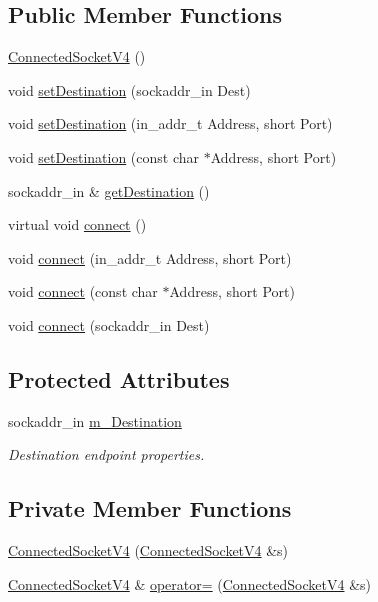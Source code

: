 \subsection*{Public Member Functions}
\begin{DoxyCompactItemize}
\item 
\hyperlink{classConnectedSocketV4_ab6fd7088764d07f276a6be26e2dd8334}{Connected\+Socket\+V4} ()
\item 
void \hyperlink{classConnectedSocketV4_a550cc6530361565ea80e0b2ce892402e}{set\+Destination} (sockaddr\+\_\+in Dest)
\item 
void \hyperlink{classConnectedSocketV4_a8f069939a6796530ba9f2a781e787db7}{set\+Destination} (in\+\_\+addr\+\_\+t Address, short Port)
\item 
void \hyperlink{classConnectedSocketV4_a9ba0783ad8bdeabd25a1ba5a2a1178fc}{set\+Destination} (const char $\ast$Address, short Port)
\item 
sockaddr\+\_\+in \& \hyperlink{classConnectedSocketV4_aba8df9ab0af83ab20a522e32b6d8e3bb}{get\+Destination} ()
\item 
virtual void \hyperlink{classConnectedSocketV4_a034d0c949fa1a0f14c136f839915d1a4}{connect} ()
\item 
void \hyperlink{classConnectedSocketV4_a9998be702c3a10a686bc6dfd914a10fe}{connect} (in\+\_\+addr\+\_\+t Address, short Port)
\item 
void \hyperlink{classConnectedSocketV4_af094a90dbff1746f213f7dcb2a46a0b7}{connect} (const char $\ast$Address, short Port)
\item 
void \hyperlink{classConnectedSocketV4_a751123cd0d6a737e87748ce2a175cd47}{connect} (sockaddr\+\_\+in Dest)
\end{DoxyCompactItemize}
\subsection*{Protected Attributes}
\begin{DoxyCompactItemize}
\item 
sockaddr\+\_\+in \hyperlink{classConnectedSocketV4_ab07c2124a1a10a7f402bba27e457d15d}{m\+\_\+\+Destination}
\begin{DoxyCompactList}\small\item\em Destination endpoint properties. \end{DoxyCompactList}\end{DoxyCompactItemize}
\subsection*{Private Member Functions}
\begin{DoxyCompactItemize}
\item 
\hyperlink{classConnectedSocketV4_a12724341a7a57fd8b5d79bce7b1dd385}{Connected\+Socket\+V4} (\hyperlink{classConnectedSocketV4}{Connected\+Socket\+V4} \&s)
\item 
\hyperlink{classConnectedSocketV4}{Connected\+Socket\+V4} \& \hyperlink{classConnectedSocketV4_a9fcb520d8f3aa2454155b6a6b5e97b39}{operator=} (\hyperlink{classConnectedSocketV4}{Connected\+Socket\+V4} \&s)
\end{DoxyCompactItemize}
